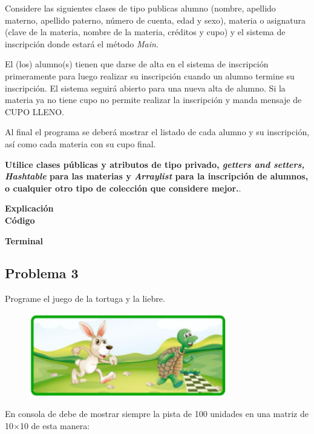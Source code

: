 \documentclass[11pt, twocolumn]{article}
\begin{document}
  Considere las siguientes clases de tipo publicas alumno (nombre, apellido materno, apellido paterno, número de cuenta, edad y sexo), materia o asignatura (clave de la materia, nombre de la materia, créditos y cupo) y el sistema de inscripción donde estará el método \textit{Main}.

  El (los) alumno(s) tienen que darse de alta en el sistema de inscripción primeramente para luego realizar su inscripción cuando un alumno termine su inscripción. El sistema seguirá abierto para una nueva alta de alumno. Si la materia ya no tiene cupo no permite realizar la inscripción y manda mensaje de CUPO LLENO.

  Al final el programa se deberá mostrar el listado de cada alumno y su inscripción, así como cada materia con su cupo final.

  \textbf{Utilice clases públicas y atributos de tipo privado, \textit{getters and setters, Hashtable} para las materias y \textit{Arraylist} para la inscripción de alumnos, o cualquier otro tipo de colección que considere mejor.}.

  \textbf{Explicación} \\
  

  \textbf{Código}

  
  \textbf{Terminal}

  \subsection*{Problema 3}
  Programe el juego de la tortuga y la liebre.

  \begin{figure}[ht]
    \includegraphics[width=0.6\columnwidth, center]{TortugaLiebre.png}
  \end{figure}
  
  En consola de debe de mostrar siempre la pista de 100 unidades en una matriz de 10$\times$10 de esta manera:
\end{document}
